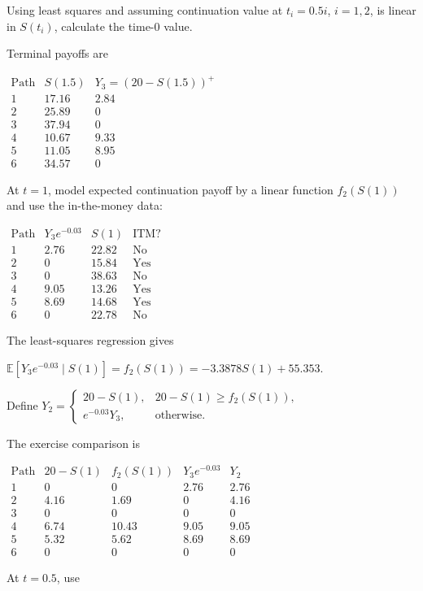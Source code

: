 Using least squares and assuming continuation value at $t_i=0.5i$, $i=1,2$, is linear in $S(t_i)$, calculate the time-$0$ value.

 Terminal payoffs are

$\begin{array}{c|cc}\text{Path}&S(1.5)&Y_3=(20-S(1.5))^+\\\hline1&17.16&2.84\\2&25.89&0\\3&37.94&0\\4&10.67&9.33\\5&11.05&8.95\\6&34.57&0\end{array}$

At $t=1$, model expected continuation payoff by a linear function $f_2(S(1))$ and use the in-the-money data:

$\begin{array}{c|ccc}\text{Path}&Y_3e^{-0.03}&S(1)&\text{ITM?}\\\hline1&2.76&22.82&\text{No}\\2&0&15.84&\text{Yes}\\3&0&38.63&\text{No}\\4&9.05&13.26&\text{Yes}\\5&8.69&14.68&\text{Yes}\\6&0&22.78&\text{No}\end{array}$

The least-squares regression gives

$\mathbb{E}[Y_3e^{-0.03}\mid S(1)]=f_2(S(1))=-3.3878S(1)+55.353$.

Define
$Y_2=\begin{cases}20-S(1),&20-S(1)\geq f_2(S(1)),\\e^{-0.03}Y_3,&\text{otherwise}.\end{cases}$

The exercise comparison is

$\begin{array}{c|ccc|c}\text{Path}&20-S(1)&f_2(S(1))&Y_3e^{-0.03}&Y_2\\\hline1&0&0&2.76&2.76\\2&4.16&1.69&0&4.16\\3&0&0&0&0\\4&6.74&10.43&9.05&9.05\\5&5.32&5.62&8.69&8.69\\6&0&0&0&0\end{array}$

At $t=0.5$, use

